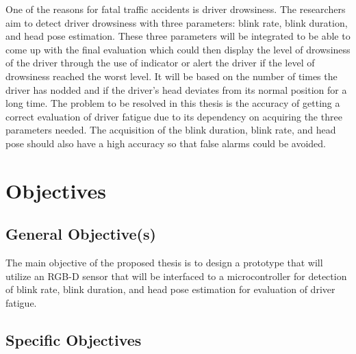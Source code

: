 One of the reasons for fatal traffic accidents is driver drowsiness. The researchers aim to detect driver drowsiness with three parameters: blink rate, blink duration, and head pose estimation. These three parameters will be integrated to be able to come up with the final evaluation which could then display the level of drowsiness of the driver through the use of indicator or alert the driver if the level of drowsiness reached the worst level. It will be based on the number of times the driver has nodded and if the driver’s head deviates from its normal position for a long time. The problem to be resolved in this thesis is the accuracy of getting a correct evaluation of driver fatigue due to its dependency on acquiring the three parameters needed. The acquisition of the blink duration, blink rate, and head pose should also have a high accuracy so that false alarms could be avoided. 



\section{Objectives}


\subsection{General Objective(s)}
The main objective of the proposed thesis is to design a prototype that will utilize an RGB-D sensor that will be interfaced to a microcontroller for detection of blink rate, blink duration, and head pose estimation for evaluation of driver fatigue.

\subsection{Specific Objectives}

